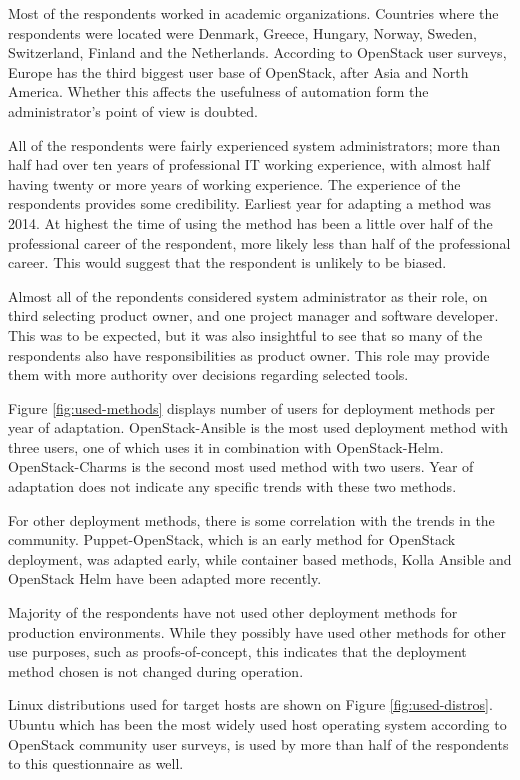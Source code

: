 \documentclass[officiallayout]{tktla}
\begin{document}
Most of the respondents worked in academic organizations. Countries where the
respondents were located were Denmark, Greece, Hungary, Norway, Sweden,
Switzerland, Finland and the Netherlands. According to OpenStack user surveys,
Europe has the third biggest user base of OpenStack, after Asia and North
America. Whether this affects the usefulness of automation form the
administrator's point of view is doubted.

All of the respondents were fairly experienced system administrators; more than
half had over ten years of professional IT working experience, with almost
half having twenty or more years of working experience. The experience of the
respondents provides some credibility. Earliest year for adapting a method was
2014. At highest the time of using the method has been a little over half of
the professional career of the respondent, more likely less than half of the
professional career. This would suggest that the respondent is unlikely to be
biased.

Almost all of the repondents considered system administrator as their role, on
third selecting product owner, and one project manager and software developer.
This was to be expected, but it was also insightful to see that so many of the
respondents also have responsibilities as product owner. This role may provide
them with more authority over decisions regarding selected tools.

Figure \ref{fig:used-methods} displays number of users for deployment methods
per year of adaptation. OpenStack-Ansible is the most used deployment method
with three users, one of which uses it in combination with OpenStack-Helm.
OpenStack-Charms is the second most used method with two users. Year of
adaptation does not indicate any specific trends with these two methods.

For other deployment methods, there is some correlation with the trends in the
community. Puppet-OpenStack, which is an early method for OpenStack deployment,
was adapted early, while container based methods, Kolla Ansible and OpenStack
Helm have been adapted more recently.

Majority of the respondents have not used other deployment methods for
production environments. While they possibly have used other methods for other
use purposes, such as proofs-of-concept, this indicates that the deployment
method chosen is not changed during operation.

Linux distributions used for target hosts are shown on Figure
\ref{fig:used-distros}. Ubuntu which has been the most widely used host
operating system according to OpenStack community user surveys, is used by more
than half of the respondents to this questionnaire as well.
\end{document}
